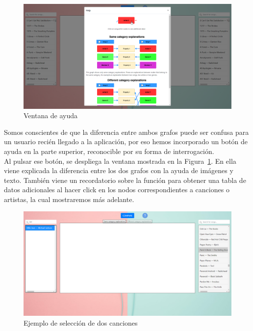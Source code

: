\begin{figure}[h!]
	\centering
	\includegraphics[width = 1\textwidth]{Imagenes/Bitmap/Pantalla modal.png}
	\caption{Ventana de ayuda}
	\label{fig:ayuda}
\end{figure}

Somos conscientes de que la diferencia entre ambos grafos puede ser confusa para un usuario recién llegado a la aplicación, por eso hemos incorporado un botón de ayuda en la parte superior, reconocible por su forma de interrogación.\\

Al pulsar ese botón, se despliega la ventana mostrada en la Figura~\ref{fig:ayuda}. En ella viene explicada la diferencia entre los dos grafos con la ayuda de imágenes y texto. También viene un recordatorio sobre la función para obtener una tabla de datos adicionales al hacer click en los nodos correspondientes a canciones o artistas, la cual mostraremos más adelante.\\

\begin{figure}[h!]
	\centering
	\includegraphics[width = 1\textwidth]{Imagenes/Bitmap/Pantalla seleccion.png}
	\caption{Ejemplo de selección de dos canciones}
	\label{fig:seleccion}
\end{figure}

